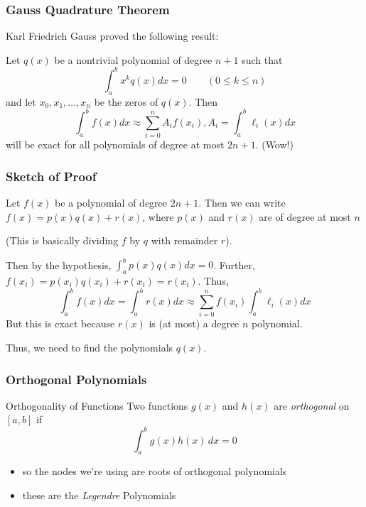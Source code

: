\documentclass[10pt]{beamer}
\begin{document}
\begin{frame}
\frametitle{Gauss Quadrature Theorem}
Karl Friedrich Gauss proved the following result:

Let $q(x)$ be a nontrivial polynomial of degree $n+1$ such that
\begin{equation*}
    \int_{a}^{b} x^k q(x) dx = 0 \qquad (0\le k \le n)
\end{equation*}
and let $x_0, x_1, \ldots, x_n$ be the zeros of $q(x)$.  Then
\begin{equation*}
  \int_{a}^{b} f(x)dx \approx \sum_{i=0}^n A_i f(x_i), A_i=\int_{a}^{b} \ell_i(x) dx
\end{equation*}
will be exact for all polynomials of degree at most $2n+1$. (Wow!)
\end{frame}
\begin{frame}
\frametitle{Sketch of Proof}
Let $f(x)$ be a polynomial of degree $2n+1$.  Then we can write
$f(x) = p(x) q(x) + r(x)$, where $p(x)$ and $r(x)$ are of degree at most $n$ 

(This is basically dividing $f$ by $q$ with remainder $r$).

Then by the hypothesis, $\int_{a}^{b} p(x)q(x)dx = 0$.  Further, 
$f(x_i) = p(x_i)q(x_i) + r(x_i) = r(x_i)$.  Thus, 
\begin{equation*}
   \int_{a}^{b} f(x)dx = \int_{a}^{b} r(x)dx \approx \sum_{i=0}^n f(x_i)\int_{a}^{b}\ell_i(x)dx
\end{equation*}
  But this is exact because $r(x)$ is (at most) a degree $n$ polynomial.

  Thus, we need to find the polynomials $q(x)$.
\end{frame}
\begin{frame}
\frametitle{Orthogonal Polynomials}
  \begin{block}{Orthogonality of Functions}
    Two functions $g(x)$ and $h(x)$ are \emph{orthogonal} on $[a,b]$ if
    \begin{equation*}
      \int_{a}^{b} g(x)h(x)\,dx = 0
    \end{equation*}
  \end{block}
  \begin{itemize}
    \item  so the nodes we're using are roots of orthogonal polynomials
    \item  these are the \emph{Legendre} Polynomials
  \end{itemize}
\end{frame}
\end{document}
